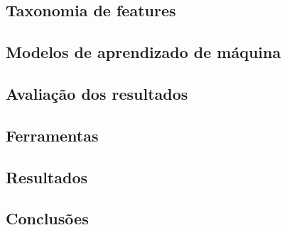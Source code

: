 \cite{EDM_retention}

\subsection*{Taxonomia de features}


\subsection*{Modelos de aprendizado de máquina}


\subsection*{Avaliação dos resultados}


\subsection*{Ferramentas}


\subsection*{Resultados}


\subsection*{Conclusões}

